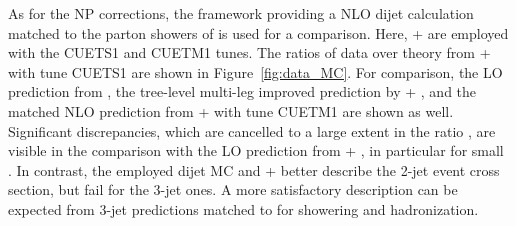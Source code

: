 As for the NP corrections, the \POWHEG framework providing a NLO dijet
calculation matched to the parton showers of \PYTHIAE is used for a
comparison. Here, \POWHEG + \PYTHIAE are employed with the CUETS1 and
CUETM1 tunes. The ratios of data over theory from \POWHEG + \PYTHIAE
with tune CUETS1 are shown in Figure~\ref{fig:data_MC}. For
comparison, the LO prediction from \PYTHIAS, the tree-level multi-leg
improved prediction by \MadGraphF + \PYTHIAS, and the matched NLO
prediction from \POWHEG + \PYTHIAE with tune CUETM1 are shown as
well. Significant discrepancies, which are cancelled to a large extent
in the ratio \ratio, are visible in the comparison with the LO
prediction from \MadGraphF + \PYTHIAS, in particular for small \httwo.
In contrast, the employed dijet MC \PYTHIAE and \POWHEG + \PYTHIAE
better describe the 2-jet event cross section, but fail for the 3-jet
ones. A more satisfactory description can be expected from 3-jet
\POWHEG predictions matched to \PYTHIAE for showering and
hadronization.

